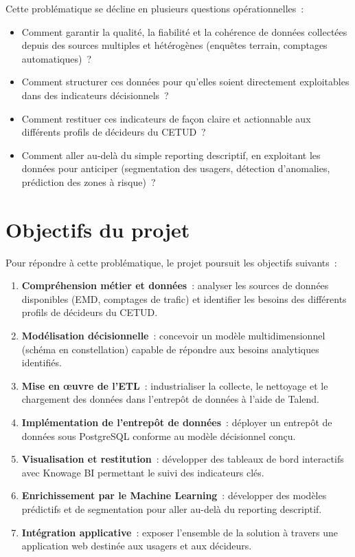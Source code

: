 Cette problématique se décline en plusieurs questions opérationnelles~:
\begin{itemize}
\item Comment garantir la qualité, la fiabilité et la cohérence de données collectées depuis des sources multiples et hétérogènes (enquêtes terrain, comptages automatiques)~?
\item Comment structurer ces données pour qu'elles soient directement exploitables dans des indicateurs décisionnels~?
\item Comment restituer ces indicateurs de façon claire et actionnable aux différents profils de décideurs du CETUD~?
\item Comment aller au-delà du simple reporting descriptif, en exploitant les données pour anticiper (segmentation des usagers, détection d'anomalies, prédiction des zones à risque)~?
\end{itemize}

\section{Objectifs du projet}
Pour répondre à cette problématique, le projet poursuit les objectifs suivants~:

\begin{enumerate}
\item \textbf{Compréhension métier et données}~: analyser les sources de données disponibles (EMD, comptages de trafic) et identifier les besoins des différents profils de décideurs du CETUD.
\item \textbf{Modélisation décisionnelle}~: concevoir un modèle multidimensionnel (schéma en constellation) capable de répondre aux besoins analytiques identifiés.
\item \textbf{Mise en œuvre de l'ETL}~: industrialiser la collecte, le nettoyage et le chargement des données dans l'entrepôt de données à l'aide de Talend.
\item \textbf{Implémentation de l'entrepôt de données}~: déployer un entrepôt de données sous PostgreSQL conforme au modèle décisionnel conçu.
\item \textbf{Visualisation et restitution}~: développer des tableaux de bord interactifs avec Knowage BI permettant le suivi des indicateurs clés.
\item \textbf{Enrichissement par le Machine Learning}~: développer des modèles prédictifs et de segmentation pour aller au-delà du reporting descriptif.
\item \textbf{Intégration applicative}~: exposer l'ensemble de la solution à travers une application web destinée aux usagers et aux décideurs.
\end{enumerate}

